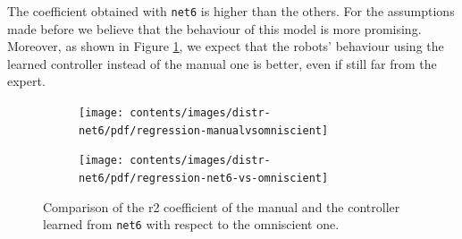 The coefficient obtained with \texttt{net6} is higher than the others. For the 
assumptions made before we believe that the behaviour of this model is more 
promising. Moreover, as shown in Figure \ref{fig:net6r2}, we expect that the 
robots’ behaviour using the learned controller instead of the manual one is 
better, even if still far from the expert.

\begin{figure}[!htb]
	\centering
	\begin{subfigure}[h]{0.49\textwidth}
		\centering
		\texttt{[image: contents/images/distr-net6/pdf/regression-manualvsomniscient]}%
	\end{subfigure}
	\hfill
	\begin{subfigure}[h]{0.49\textwidth}
		\centering
		\texttt{[image: contents/images/distr-net6/pdf/regression-net6-vs-omniscient]}
	\end{subfigure}
	\caption[Evaluation of the \gls{r2} coefficient of \texttt{net6} .]{Comparison of 
	the \gls{r2} coefficient of the manual and the controller 
	learned from \texttt{net6} with respect to the omniscient one.}
	\label{fig:net6r2}
\end{figure}

